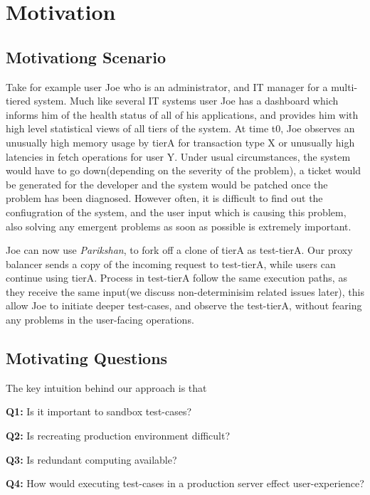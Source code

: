 
\section{Motivation}

\subsection{Motivationg Scenario}

Take for example user Joe who is an administrator, and IT manager for a multi-tiered system. 
Much like several IT systems user Joe has a dashboard which informs him of the health status of all of his applications, and provides him with high level statistical views of all tiers of the system.
At time t0, Joe observes an unusually high memory usage by tierA for transaction type X or unusually high latencies in fetch operations for user Y.
Under usual circumstances, the system would have to go down(depending on the severity of the problem), a ticket would be generated for the developer and the system would be patched once the problem has been diagnosed.
However often, it is difficult to find out the confiugration of the system, and the user input which is causing this problem, also solving any emergent problems as soon as possible is extremely important.

Joe can now use \textit{Parikshan}, to fork off a clone of tierA as test-tierA. Our proxy balancer sends a copy of the incoming request to test-tierA, while users can continue using tierA. 
Process in test-tierA follow the same execution paths, as they receive the same input(we discuss non-determinisim related issues later), this allow Joe to initiate deeper test-cases, and observe the test-tierA, without fearing any problems in the user-facing operations.


\subsection{Motivating Questions}
The key intuition behind our approach is that \\


\begin{compactitem}
\setlength{\itemsep}{1Pt}
\item[]\textbf{Q1:} Is it important to sandbox test-cases?
\item[]\textbf{Q2:} Is recreating production environment difficult? 
\item[]\textbf{Q3:} Is redundant computing available? 
\item[]\textbf{Q4:} How would executing test-cases in a production server effect user-experience?
\end{compactitem}

